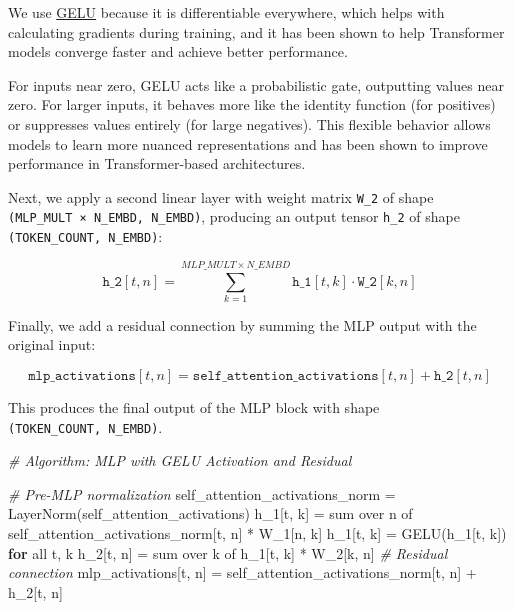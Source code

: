 \documentclass[11pt]{article}
\newenvironment{Shaded}{}{}
\newcommand{\CommentTok}[1]{\textcolor[rgb]{0.38,0.63,0.69}{\textit{{#1}}}}
\newcommand{\NormalTok}[1]{{#1}}
\newcommand{\ControlFlowTok}[1]{\textcolor[rgb]{0.00,0.44,0.13}{\textbf{{#1}}}}
\newcommand{\OperatorTok}[1]{\textcolor[rgb]{0.40,0.40,0.40}{{#1}}}
\newcommand{\BuiltInTok}[1]{{#1}}
\begin{document}
We use \href{https://arxiv.org/abs/1606.08415}{GELU} because it is
differentiable everywhere, which helps with calculating gradients during
training, and it has been shown to help Transformer models converge
faster and achieve better performance.

For inputs near zero, GELU acts like a probabilistic gate, outputting
values near zero. For larger inputs, it behaves more like the identity
function (for positives) or suppresses values entirely (for large
negatives). This flexible behavior allows models to learn more nuanced
representations and has been shown to improve performance in
Transformer-based architectures.

Next, we apply a second linear layer with weight matrix \texttt{W\_2} of
shape \texttt{(MLP\_MULT\ ×\ N\_EMBD,\ N\_EMBD)}, producing an output
tensor \texttt{h\_2} of shape \texttt{(TOKEN\_COUNT,\ N\_EMBD)}:

\[
\texttt{h\_2}[t, n] = \sum_{k=1}^{MLP\_MULT \times N\_EMBD} \texttt{h\_1}[t, k] \cdot \texttt{W\_2}[k, n]
\]

Finally, we add a residual connection by summing the MLP output with the
original input:

\[
\texttt{mlp\_activations}[t, n] = \texttt{self\_attention\_activations}[t, n] + \texttt{h\_2}[t, n]
\]

This produces the final output of the MLP block with shape
\texttt{(TOKEN\_COUNT,\ N\_EMBD)}.

\begin{Shaded}
\begin{Highlighting}[]
\CommentTok{\# Algorithm: MLP with GELU Activation and Residual}

\CommentTok{\# Pre{-}MLP normalization}
\NormalTok{self\_attention\_activations\_norm }\OperatorTok{=}\NormalTok{ LayerNorm(self\_attention\_activations)}
\NormalTok{h\_1[t, k] }\OperatorTok{=} \BuiltInTok{sum}\NormalTok{ over n of self\_attention\_activations\_norm[t, n] }\OperatorTok{*}\NormalTok{ W\_1[n, k]}
\NormalTok{h\_1[t, k] }\OperatorTok{=}\NormalTok{ GELU(h\_1[t, k]) }\ControlFlowTok{for} \BuiltInTok{all}\NormalTok{ t, k}
\NormalTok{h\_2[t, n] }\OperatorTok{=} \BuiltInTok{sum}\NormalTok{ over k of h\_1[t, k] }\OperatorTok{*}\NormalTok{ W\_2[k, n]}
\CommentTok{\# Residual connection}
\NormalTok{mlp\_activations[t, n] }\OperatorTok{=}\NormalTok{ self\_attention\_activations\_norm[t, n] }\OperatorTok{+}\NormalTok{ h\_2[t, n]}
\end{Highlighting}
\end{Shaded}
\end{document}
